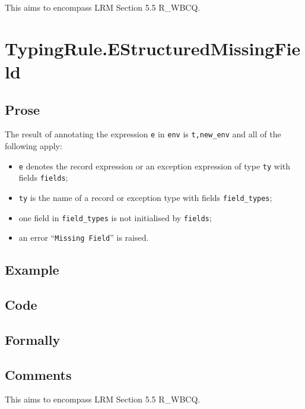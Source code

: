 \documentclass{book}
\begin{document}

  This aims to encompass LRM Section 5.5 R\_WBCQ.

\section{TypingRule.EStructuredMissingField \label{sec:TypingRule.EStructuredMissingField}}

  \subsection{Prose}
  The result of annotating the expression \texttt{e} in \texttt{env} is
\texttt{t,new\_env} and all of the following apply:
  \begin{itemize}
  \item \texttt{e} denotes the record expression or an exception expression of type \texttt{ty} with fields \texttt{fields};
  \item \texttt{ty} is the name of a record or exception type with fields \texttt{field\_types};
  \item one field in \texttt{field\_types} is not initialised by \texttt{fields};
  \item an error ``\texttt{Missing Field}'' is raised.
  \end{itemize}

  \subsection{Example}

  \subsection{Code}

\begin{emptyformal}
    \subsection{Formally}
\end{emptyformal}

\subsection{Comments}
  This aims to encompass LRM Section 5.5 R\_WBCQ.
\end{document}
